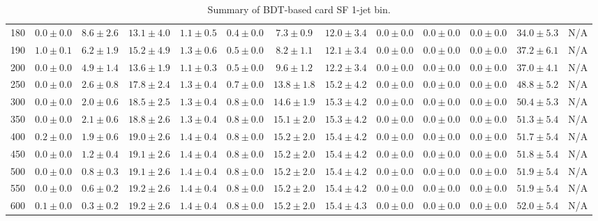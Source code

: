 \begin{table}
{\begin{center}
\begin{tabular}{l | c c | c c c c c c c c  | c c}
180 & $0.0\pm0.0$ & $8.6\pm2.6$ & $13.1\pm4.0$ & $1.1\pm0.5$ & $0.4\pm0.0$ & $7.3\pm0.9$ & $12.0\pm3.4$ & $0.0\pm0.0$ & $0.0\pm0.0$ & $0.0\pm0.0$ & $34.0\pm5.3$ & N/A \\
190 & $1.0\pm0.1$ & $6.2\pm1.9$ & $15.2\pm4.9$ & $1.3\pm0.6$ & $0.5\pm0.0$ & $8.2\pm1.1$ & $12.1\pm3.4$ & $0.0\pm0.0$ & $0.0\pm0.0$ & $0.0\pm0.0$ & $37.2\pm6.1$ & N/A \\
200 & $0.0\pm0.0$ & $4.9\pm1.4$ & $13.6\pm1.9$ & $1.1\pm0.3$ & $0.5\pm0.0$ & $9.6\pm1.2$ & $12.2\pm3.4$ & $0.0\pm0.0$ & $0.0\pm0.0$ & $0.0\pm0.0$ & $37.0\pm4.1$ & N/A \\
250 & $0.0\pm0.0$ & $2.6\pm0.8$ & $17.8\pm2.4$ & $1.3\pm0.4$ & $0.7\pm0.0$ & $13.8\pm1.8$ & $15.2\pm4.2$ & $0.0\pm0.0$ & $0.0\pm0.0$ & $0.0\pm0.0$ & $48.8\pm5.2$ & N/A \\
300 & $0.0\pm0.0$ & $2.0\pm0.6$ & $18.5\pm2.5$ & $1.3\pm0.4$ & $0.8\pm0.0$ & $14.6\pm1.9$ & $15.3\pm4.2$ & $0.0\pm0.0$ & $0.0\pm0.0$ & $0.0\pm0.0$ & $50.4\pm5.3$ &  N/A \\
350 & $0.0\pm0.0$ & $2.1\pm0.6$ & $18.8\pm2.6$ & $1.3\pm0.4$ & $0.8\pm0.0$ & $15.1\pm2.0$ & $15.3\pm4.2$ & $0.0\pm0.0$ & $0.0\pm0.0$ & $0.0\pm0.0$ & $51.3\pm5.4$ &  N/A \\
400 & $0.2\pm0.0$ & $1.9\pm0.6$ & $19.0\pm2.6$ & $1.4\pm0.4$ & $0.8\pm0.0$ & $15.2\pm2.0$ & $15.4\pm4.2$ & $0.0\pm0.0$ & $0.0\pm0.0$ & $0.0\pm0.0$ & $51.7\pm5.4$ &  N/A \\
450 & $0.0\pm0.0$ & $1.2\pm0.4$ & $19.1\pm2.6$ & $1.4\pm0.4$ & $0.8\pm0.0$ & $15.2\pm2.0$ & $15.4\pm4.2$ & $0.0\pm0.0$ & $0.0\pm0.0$ & $0.0\pm0.0$ & $51.8\pm5.4$ &  N/A \\
500 & $0.0\pm0.0$ & $0.8\pm0.3$ & $19.1\pm2.6$ & $1.4\pm0.4$ & $0.8\pm0.0$ & $15.2\pm2.0$ & $15.4\pm4.2$ & $0.0\pm0.0$ & $0.0\pm0.0$ & $0.0\pm0.0$ & $51.9\pm5.4$ &  N/A \\
550 & $0.0\pm0.0$ & $0.6\pm0.2$ & $19.2\pm2.6$ & $1.4\pm0.4$ & $0.8\pm0.0$ & $15.2\pm2.0$ & $15.4\pm4.2$ & $0.0\pm0.0$ & $0.0\pm0.0$ & $0.0\pm0.0$ & $51.9\pm5.4$ &  N/A \\
600 & $0.1\pm0.0$ & $0.3\pm0.2$ & $19.2\pm2.6$ & $1.4\pm0.4$ & $0.8\pm0.0$ & $15.2\pm2.0$ & $15.4\pm4.3$ & $0.0\pm0.0$ & $0.0\pm0.0$ & $0.0\pm0.0$ & $52.0\pm5.4$ &  N/A \\
\hline
\end{tabular}
\end{center}
}
\caption{Summary of BDT-based card SF 1-jet bin.}
\end{table}
